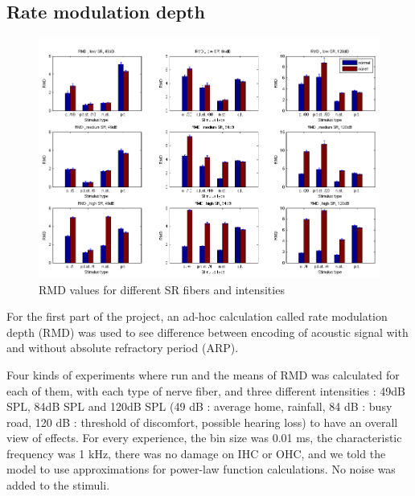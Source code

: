 
\subsection{Rate modulation depth}

\begin{figure}[ht]
	\centering
  \includegraphics[width=\textwidth]{images/rmds9.png} %
	\caption{RMD values for different SR fibers and intensities}
	\label{fig:rmds}
\end{figure}

For the first part of the project, an ad-hoc calculation called rate 
modulation depth (RMD) was used to see difference between encoding 
of acoustic signal with and without absolute refractory period (ARP).

Four kinds of experiments where run and the means of RMD was calculated 
for each of them, 
with each type of nerve fiber, and three different intensities : 
49dB SPL, 84dB SPL and 120dB SPL (49 dB : average home, rainfall, 84 dB : busy road, 120 dB : threshold of discomfort, possible hearing loss) 
to have an overall view of effects.
For every experience, the bin size was 0.01 ms, the characteristic frequency was 1 kHz, 
there was no damage on IHC or OHC, and we told the model to use approximations 
for power-law function calculations. No noise was added to the stimuli.

